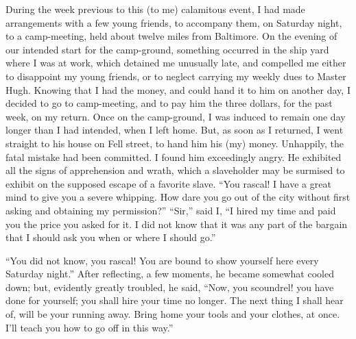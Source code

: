 During the week previous to this (to me) calamitous event, I had made
arrangements with a few young friends, to accompany them, on Saturday
night, to a camp-meeting, held about twelve miles from Baltimore. On the
evening of our intended start for the camp-ground, something occurred in
the ship yard where I was at work, which detained me unusually late, and
compelled me either to disappoint my young friends, or to neglect
carrying my weekly dues to Master Hugh. Knowing that I had the money,
and {\protect\hypertarget{330}{}{}}could hand it to him on another day,
I decided to go to camp-meeting, and to pay him the three dollars, for
the past week, on my return. Once on the camp-ground, I was induced to
remain one day longer than I had intended, when I left home. But, as
soon as I returned, I went straight to his house on Fell street, to hand
him his (my) money. Unhappily, the fatal mistake had been committed. I
found him exceedingly angry. He exhibited all the signs of apprehension
and wrath, which a slaveholder may be surmised to exhibit on the
supposed escape of a favorite slave. ``You rascal! I have a great mind
to give you a severe whipping. How dare you go out of the city without
first asking and obtaining my permission?'' ``Sir,'' said I, ``I hired
my time and paid you the price you asked for it. I did not know that it
was any part of the bargain that I should ask you when or where I should
go.''

``You did not know, you rascal! You are bound to show yourself here
every Saturday night.'' After reflecting, a few moments, he became
somewhat cooled down; but, evidently greatly troubled, he said, ``Now,
you scoundrel! you have done for yourself; you shall hire your time no
longer. The next thing I shall hear of, will be your running away. Bring
home your tools and your clothes, at once. I'll teach you how to go off
in this way.''

